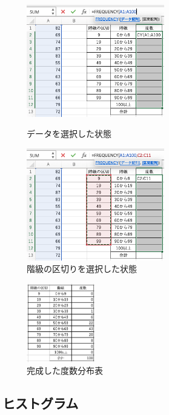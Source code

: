 \begin{figure}[htbp]
    \begin{minipage}{0.5\hsize}
        \centering
        \includegraphics[width=6cm]{chap1/select_data_freq.png}
        \caption{データを選択した状態}
        \label{fig:select_data_freq}
    \end{minipage}
    \begin{minipage}{0.5\hsize}
        \centering
        \includegraphics[width=6cm]{chap1/select_classes_freq.png}
        \caption{階級の区切りを選択した状態}
        \label{fig:select_classes_freq}
    \end{minipage}
\end{figure}

\begin{figure}[htbp]
    \centering
    \includegraphics[width=3cm]{chap1/freq.png}
    \caption{完成した度数分布表}
    \label{fig:freq}
\end{figure}

\subsection{ヒストグラム}

